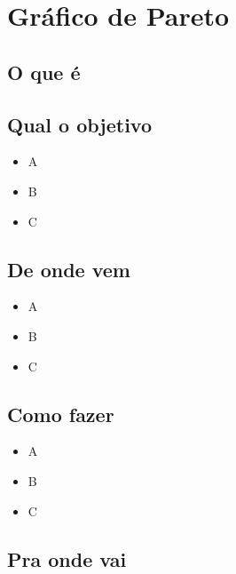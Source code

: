 \documentclass[
]{article}
\providecommand{\tightlist}{%
  \setlength{\itemsep}{0pt}\setlength{\parskip}{0pt}}
\begin{document}
\hypertarget{gruxe1fico-de-pareto}{%
\section{Gráfico de Pareto}\label{gruxe1fico-de-pareto}}

\hypertarget{o-que-uxe9-4}{%
\subsection*{O que é}\label{o-que-uxe9-4}}

\hypertarget{qual-o-objetivo-4}{%
\subsection*{Qual o objetivo}\label{qual-o-objetivo-4}}

\begin{itemize}
\tightlist
\item
  A
\item
  B
\item
  C
\end{itemize}

\hypertarget{de-onde-vem-4}{%
\subsection*{De onde vem}\label{de-onde-vem-4}}

\begin{itemize}
\tightlist
\item
  A
\item
  B
\item
  C
\end{itemize}

\hypertarget{como-fazer-4}{%
\subsection*{Como fazer}\label{como-fazer-4}}

\begin{itemize}
\tightlist
\item
  A
\item
  B
\item
  C
\end{itemize}

\hypertarget{pra-onde-vai-4}{%
\subsection*{Pra onde vai}\label{pra-onde-vai-4}}
\end{document}
